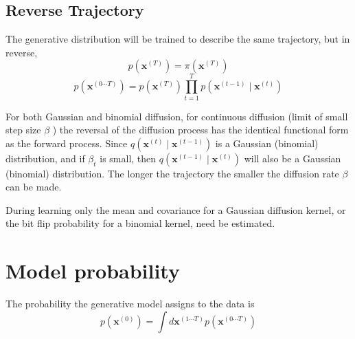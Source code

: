\subsection{Reverse Trajectory}
\label{sec:reverse-trajectory}
The generative distribution will be trained to describe the same trajectory, but in reverse,
\begin{equation}
  \label{eq:31}
  p\left(\mathbf{x}^{(T)}\right)=\pi\left(\mathbf{x}^{(T)}\right)
\end{equation}
\begin{equation}
  \label{eq:32}
  p\left(\mathbf{x}^{(0 \cdots T)}\right)=p\left(\mathbf{x}^{(T)}\right) \prod_{t=1}^T p\left(\mathbf{x}^{(t-1)} \mid \mathbf{x}^{(t)}\right)
\end{equation}

For both Gaussian and binomial diffusion, for continuous diffusion (limit of small step size $\beta$ ) the reversal of the diffusion process has the identical functional form as the forward process.
Since $q\left(\mathbf{x}^{(t)} \mid \mathbf{x}^{(t-1)}\right)$ is a Gaussian (binomial) distribution, and if $\beta_t$ is small, then $q\left(\mathbf{x}^{(t-1)} \mid \mathbf{x}^{(t)}\right)$ will also be a Gaussian (binomial) distribution.
The longer the trajectory the smaller the diffusion rate $\beta$ can be made.

During learning only the mean and covariance for a Gaussian diffusion kernel, or the bit flip probability for a binomial kernel, need be estimated.


\section{Model probability}
\label{sec:model-probability}

The probability the generative model assigns to the data is
\begin{equation}
  \label{eq:33}
p\left(\mathbf{x}^{(0)}\right)=\int d \mathbf{x}^{(1 \cdots T)} p\left(\mathbf{x}^{(0 \cdots T)}\right)  
\end{equation}

